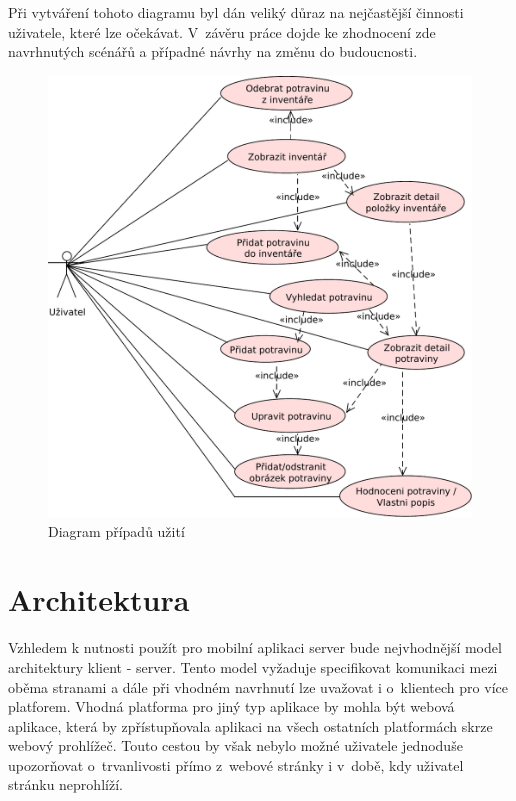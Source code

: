 \documentclass[thesis=B,czech]{FITthesis}[2013/10/20]
\begin{document}
Při vytváření tohoto diagramu byl dán veliký důraz na nejčastější činnosti uživatele, které lze očekávat. V~závěru práce dojde ke zhodnocení zde navrhnutých scénářů a případné návrhy na změnu do budoucnosti.

\begin{figure}[H]
  \centering
  \includegraphics[scale=0.75]{diagrams/use_case}
  \caption{Diagram případů užití}
  \label{fig:UseCase}
\end{figure}

\section{Architektura}

Vzhledem k nutnosti použít pro mobilní aplikaci server bude nejvhodnější model architektury klient - server. Tento model vyžaduje specifikovat komunikaci mezi oběma stranami a dále při vhodném navrhnutí lze uvažovat i o~klientech pro více platforem. Vhodná platforma pro jiný typ aplikace by mohla být webová aplikace, která by zpřístupňovala aplikaci na všech ostatních platformách skrze webový prohlížeč. Touto cestou by však nebylo možné uživatele jednoduše upozorňovat o~trvanlivosti přímo z~webové stránky i v~době, kdy uživatel stránku neprohlíží.
\end{document}
